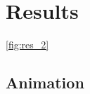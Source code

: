 \documentclass[../Dissertation]{subfiles}
\begin{document}
\section{Results}\label{results_2}
    \lipsum[64] \cref{fig:res_2}
    
    
    \lipsum[64-71]
    
\subsection{Animation}
    
\end{document}
